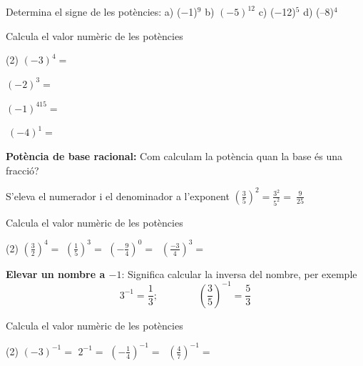 \begin{mylist}

\exer \mental Determina el signe de les potències:  a) ($-$1)${}^{9}$ \quad b) ${(-5)}^{12}$  \quad c) ($-$12)${}^{5}$ \quad   d) (--8)${}^{4}$ 

\exer  \spen Calcula el valor numèric de les potències
\begin{tasks}(2)
 \task ${\left(-3\right)}^4=$ 
 
 \task ${\left(-2\right)}^3=$ 
 
 \task ${\left(-1\right)}^{415}=$ 
 
 \task $\ {\left(-4\right)}^1=$
 
 \end{tasks}
\answers[cols=2]{[$81$, $-8$, $-1$, $-4$]}
  
\end{mylist}

\begin{example}
 \textbf{Potència de base racional: }Com calculam la potència quan la base és una fracció?

    S'eleva el numerador i el denominador a l'exponent ${\left(\frac{3}{5}\right)}^2=\frac{3^2}{5^2}=\ \frac{9}{25}$
\end{example}


\begin{mylist}
\exer \spen Calcula el valor numèric de les potències
\begin{tasks}(2)
\task  ${\left(\frac{3}{2}\right)}^4=$   \task ${\left(\frac{1}{5}\right)}^3=$  \task ${\left(-\frac{9}{4}\right)}^0=$  \task $\ {\left(\frac{-3}{4}\right)}^3=$
 \end{tasks}
\end{mylist}

\begin{theorybox}
 \textbf{Elevar un nombre a $-1$}: Significa calcular la inversa del nombre, per exemple
\[{\mathrm{3}}^{\mathrm{-}\mathrm{1}}\mathrm{=}\frac{\mathrm{1}}{\mathrm{3}};   \quad\quad\quad\quad  {\left(\frac{\mathrm{3}}{\mathrm{5}}\right)}^{\mathrm{-}\mathrm{1}}\mathrm{=}\frac{\mathrm{5}}{\mathrm{3}}\] 
\end{theorybox}

\begin{mylist}

\exer \spen Calcula el valor numèric de les potències
\begin{tasks}(2)
\task  ${\left(-3\right)}^{-1}=$   \task $2^{-1}=$   \task ${\left(-\frac{1}{4}\right)}^{-1}=$   \task $\ {\left(\frac{4}{7}\right)}^{-1}=$
\end{tasks}
\end{mylist}


